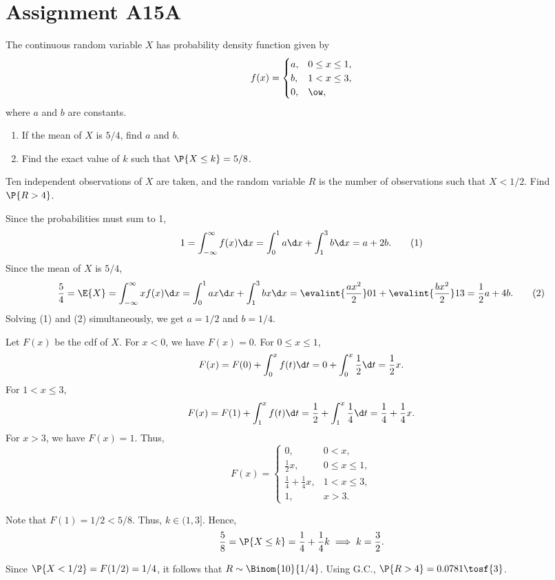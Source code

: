 \section{Assignment A15A}

\begin{problem}
    The continuous random variable $X$ has probability density function given by \[f(x) = \begin{cases}
        a, & 0 \leq x \leq 1,\\
        b, & 1 < x \leq 3,\\
        0, & \ow,
    \end{cases}\] where $a$ and $b$ are constants.

    \begin{enumerate}
        \item If the mean of $X$ is $5/4$, find $a$ and $b$.
        \item Find the exact value of $k$ such that $\P{X \leq k} = 5/8$.
    \end{enumerate}

    Ten independent observations of $X$ are taken, and the random variable $R$ is the number of observations such that $X < 1/2$. Find $\P{R > 4}$.
\end{problem}
\begin{solution}
    \begin{ppart}
        Since the probabilities must sum to 1, \[1 = \int_{-\infty}^\infty f(x) \d x = \int_0^1 a \d x + \int_1^3 b \d x = a + 2b. \tag{1}\] Since the mean of $X$ is $5/4$, \[\frac54 = \E{X} = \int_{-\infty}^\infty x f(x) \d x = \int_0^1 ax \d x + \int_1^3 bx \d x = \evalint{\frac{ax^2}{2}}01 + \evalint{\frac{bx^2}2}13 = \frac12 a + 4b. \tag{2}\] Solving (1) and (2) simultaneously, we get $a = 1/2$ and $b = 1/4$.
    \end{ppart}
    \begin{ppart}
        Let $F(x)$ be the cdf of $X$. For $x < 0$, we have $F(x) = 0$. For $0 \leq x \leq 1$, \[F(x) = F(0) + \int_0^x f(t) \d t = 0 + \int_0^x \frac12 \d t = \frac12 x.\] For $1 < x \leq 3$, \[F(x) = F(1) + \int_1^x f(t) \d t = \frac12 + \int_1^x \frac14 \d t = \frac14 + \frac14 x.\] For $x > 3$, we have $F(x) = 1$. Thus, \[F(x) = \begin{cases}
            0, & 0 < x,\\
            \frac12 x, & 0 \leq x \leq 1,\\
            \frac14 + \frac14 x, & 1 < x \leq 3,\\
            1, & x > 3.
        \end{cases}\]

        Note that $F(1) = 1/2 < 5/8$. Thus, $k \in (1, 3]$. Hence, \[\frac58 = \P{X \leq k} = \frac14 + \frac14 k \implies k = \frac32.\]
    \end{ppart}

    Since $\P{X < 1/2} = F(1/2) = 1/4$, it follows that $R \sim \Binom{10}{1/4}$. Using G.C., $\P{R > 4} = 0.0781 \tosf{3}$.
\end{solution}


